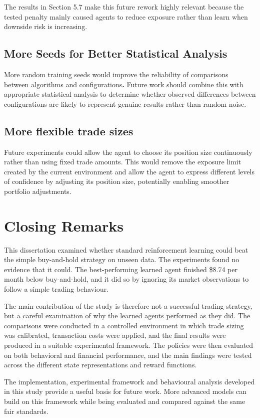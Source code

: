 The results in Section 5.7 make this future rework highly relevant
because the tested penalty mainly caused agents to reduce exposure
rather than learn when downside risk is increasing.

\subsection{More Seeds for Better Statistical Analysis}

More random training seeds would improve the reliability of comparisons~\cite{henderson2018}
between algorithms and configurations\textbf{.} Future work should
combine this with appropriate statistical analysis to determine whether
observed differences between configurations are likely to represent
genuine results rather than random noise.

\subsection{More flexible trade sizes}

Future experiments could allow the agent to choose its position size
continuously rather than using fixed trade amounts. This would remove
the exposure limit created by the current environment and allow the
agent to express different levels of confidence by adjusting its
position size, potentially enabling smoother portfolio adjustments.

\section{Closing Remarks}

This dissertation examined whether standard reinforcement learning could
beat the simple buy-and-hold strategy on unseen data. The experiments
found no evidence that it could. The best-performing learned agent
finished \$8.74 per month below buy-and-hold, and it did so by ignoring its market
observations to follow a simple trading behaviour.

The main contribution of the study is therefore not a successful trading
strategy, but a careful examination of why the learned agents performed
as they did. The comparisons were conducted in a controlled environment
in which trade sizing was calibrated, transaction costs were applied,
and the final results were produced in a suitable experimental
framework. The policies were then evaluated on both behavioral and
financial performance, and the main findings were tested across the
different state representations and reward functions.

The implementation, experimental framework and behavioural analysis
developed in this study provide a useful basis for future work. More
advanced models can build on this framework while being evaluated and
compared against the same fair standards.
